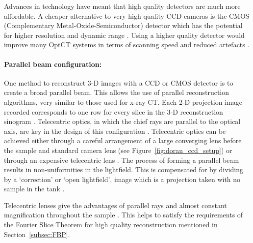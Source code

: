 
Advances in technology have meant that  high quality detectors are much more affordable. A cheaper alternative to very high quality CCD cameras is the CMOS (Complementary Metal-Oxide-Semiconductor) detector which has the potential for higher resolution and dynamic range \cite{Doran:2008kh}. Using a higher quality detector would improve many OptCT systems  in terms of scanning speed and reduced artefacts \cite{Tarte:2007, Doran:2001ee}.


\paragraph{Parallel beam configuration:} One method to reconstruct 3-D images with a CCD or CMOS detector is to create a broad parallel beam. This allows the use of parallel reconstruction algorithms, very similar to those used for x-ray CT. Each 2-D projection image recorded corresponds to one row for every slice in the 3-D reconstruction sinogram \cite{Doran:2008kh}.
Telecentric optics, in which the chief rays are parallel to the optical axis, are key in the design of this configuration \cite{Walls:2005ja}. Telecentric optics can be achieved either through a careful arrangement  of  a large converging lens before the sample and standard camera lens  \cite{Doran:2001ee} (see Figure~\ref{fig:doran_ccd_setup}) or through an expensive telecentric lens \cite{Sakhalkar:2008exa}. The process of forming a parallel beam results in non-uniformities in the lightfield. This is compensated for by dividing by a `correction' or `open lightfield', image which is a projection taken with no sample in the tank \cite{Doran:2001ee}.

Telecentric lenses give the advantages of parallel rays and almost constant magnification throughout the sample \cite{Oldham:2007ku}. This helps to satisfy the requirements of the Fourier Slice Theorem for high quality reconstruction mentioned in Section~\ref{subsec:FBP}.


